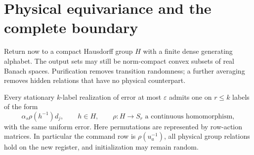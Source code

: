 \section{Physical equivariance and the complete boundary}\label{sec:boundary56}
Return now to a compact Hausdorff group $H$ with a finite dense generating alphabet. The output sets may still be norm-compact convex subsets of real Banach spaces. Purification removes transition randomness; a further averaging removes hidden relations that have no physical counterpart.

\begin{theorem}\label{thm:equivariant56}
Every stationary $k$-label realization of error at most $\varepsilon$ admits one on $r\le k$ labels of the form
\begin{equation}\label{eq:equivariant56}
 \alpha_s\rho(h^{-1})d_j,\qquad h\in H,
 \qquad \rho:H\longrightarrow S_r\text{ a continuous homomorphism},
\end{equation}
with the same uniform error. Here permutations are represented by row-action matrices. In particular the command row is $\rho(u_a^{-1})$, all physical group relations hold on the new register, and initialization may remain random.
\end{theorem}
